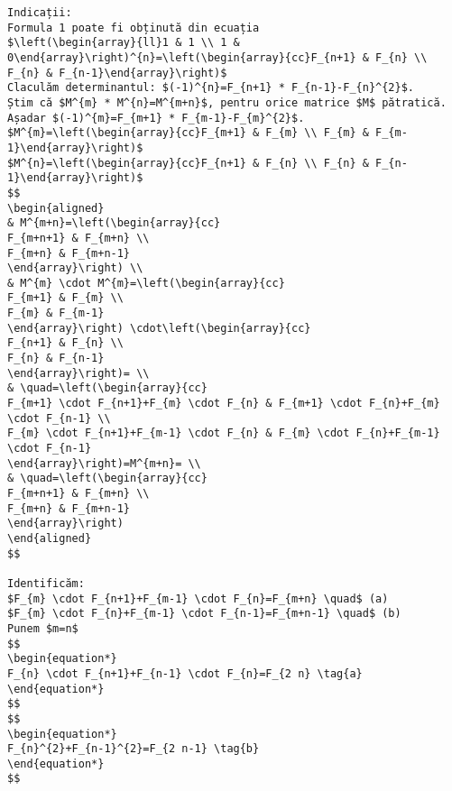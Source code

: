 \begin{verbatim}
Indicații:
Formula 1 poate fi obținută din ecuația
$\left(\begin{array}{ll}1 & 1 \\ 1 & 0\end{array}\right)^{n}=\left(\begin{array}{cc}F_{n+1} & F_{n} \\ F_{n} & F_{n-1}\end{array}\right)$
Claculăm determinantul: $(-1)^{n}=F_{n+1} * F_{n-1}-F_{n}^{2}$.
Știm că $M^{m} * M^{n}=M^{m+n}$, pentru orice matrice $M$ pătratică.
Așadar $(-1)^{m}=F_{m+1} * F_{m-1}-F_{m}^{2}$.
$M^{m}=\left(\begin{array}{cc}F_{m+1} & F_{m} \\ F_{m} & F_{m-1}\end{array}\right)$
$M^{n}=\left(\begin{array}{cc}F_{n+1} & F_{n} \\ F_{n} & F_{n-1}\end{array}\right)$
$$
\begin{aligned}
& M^{m+n}=\left(\begin{array}{cc}
F_{m+n+1} & F_{m+n} \\
F_{m+n} & F_{m+n-1}
\end{array}\right) \\
& M^{m} \cdot M^{m}=\left(\begin{array}{cc}
F_{m+1} & F_{m} \\
F_{m} & F_{m-1}
\end{array}\right) \cdot\left(\begin{array}{cc}
F_{n+1} & F_{n} \\
F_{n} & F_{n-1}
\end{array}\right)= \\
& \quad=\left(\begin{array}{cc}
F_{m+1} \cdot F_{n+1}+F_{m} \cdot F_{n} & F_{m+1} \cdot F_{n}+F_{m} \cdot F_{n-1} \\
F_{m} \cdot F_{n+1}+F_{m-1} \cdot F_{n} & F_{m} \cdot F_{n}+F_{m-1} \cdot F_{n-1}
\end{array}\right)=M^{m+n}= \\
& \quad=\left(\begin{array}{cc}
F_{m+n+1} & F_{m+n} \\
F_{m+n} & F_{m+n-1}
\end{array}\right)
\end{aligned}
$$

Identificăm:
$F_{m} \cdot F_{n+1}+F_{m-1} \cdot F_{n}=F_{m+n} \quad$ (a)
$F_{m} \cdot F_{n}+F_{m-1} \cdot F_{n-1}=F_{m+n-1} \quad$ (b)
Punem $m=n$
$$
\begin{equation*}
F_{n} \cdot F_{n+1}+F_{n-1} \cdot F_{n}=F_{2 n} \tag{a}
\end{equation*}
$$
$$
\begin{equation*}
F_{n}^{2}+F_{n-1}^{2}=F_{2 n-1} \tag{b}
\end{equation*}
$$


\end{verbatim}
